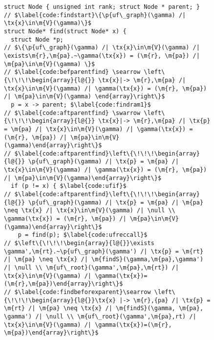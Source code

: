 \begin{figure}[t]
\vspace{-1ex}
  \begin{lstlisting}
struct Node { unsigned int rank; struct Node * parent; }
// $\label{code:findstart}\{\p{uf\_graph}(\gamma) /| \tx{x}\in\m{V}(\gamma)\}$
struct Node* find(struct Node* x) {
  struct Node *p;
// $\{\p{uf\_graph}(\gamma) /| \tx{x}\in\m{V}(\gamma) /| \exists\m{r},\m{pa}.~\gamma(\tx{x}) = (\m{r}, \m{pa}) /| \m{pa}\in\m{V}(\gamma) \}$
// $\label{code:befparentfind} \searrow \left\{\!\!\!\begin{array}{l@{}} \tx{x}|-> \m{r},\m{pa} /| \tx{x}\in\m{V}(\gamma) /| \gamma(\tx{x}) = (\m{r}, \m{pa}) /| \m{pa}\in\m{V}(\gamma) \end{array}\right\}$
  p = x -> parent; $\label{code:findram1}$
// $\label{code:aftparentfind} \swarrow \left\{\!\!\!\begin{array}{l@{}} \tx{x}|-> \m{r},\m{pa} /| \tx{p} = \m{pa} /| \tx{x}\in\m{V}(\gamma) /| \gamma(\tx{x}) = (\m{r}, \m{pa}) /| \m{pa}\in\m{V}(\gamma)\end{array}\right\}$
// $\label{code:aftparentfind}\left\{\!\!\!\begin{array}{l@{}} \p{uf\_graph}(\gamma) /| \tx{p} = \m{pa} /| \tx{x}\in\m{V}(\gamma) /| \gamma(\tx{x}) = (\m{r}, \m{pa}) /| \m{pa}\in\m{V}(\gamma)\end{array}\right\}$
  if (p != x) { $\label{code:ufif}$
// $\label{code:aftparentfind}\left\{\!\!\!\begin{array}{l@{}} \p{uf\_graph}(\gamma) /| \tx{p} = \m{pa} /| \m{pa} \neq \tx{x} /| \tx{x}\in\m{V}(\gamma) /| \null \\ \gamma(\tx{x}) = (\m{r}, \m{pa}) /| \m{pa}\in\m{V}(\gamma)\end{array}\right\}$
    p = find(p); $\label{code:ufreccall}$
// $\left\{\!\!\!\begin{array}{l@{}}\exists \gamma',\m{rt}.~\p{uf\_graph}(\gamma') /| \tx{p} = \m{rt} /| \m{pa} \neq \tx{x} /| \m{findS}(\gamma,\m{pa},\gamma') /| \null \\ \m{uf\_root}(\gamma',\m{pa},\m{rt}) /| \tx{x}\in\m{V}(\gamma) /| \gamma(\tx{x})=(\m{r},\m{pa})\end{array}\right\}$
// $\label{code:findbeforexparent}\searrow \left\{\!\!\!\begin{array}{l@{}}\tx{x} |-> \m{r},{pa} /| \tx{p} = \m{rt} /| \m{pa} \neq \tx{x} /| \m{findS}(\gamma, \m{pa}, \gamma') /| \null \\ \m{uf\_root}(\gamma',\m{pa},rt) /| \tx{x}\in\m{V}(\gamma) /| \gamma(\tx{x})=(\m{r}, \m{pa})\end{array}\right\}$

\end{lstlisting}
\end{figure}
